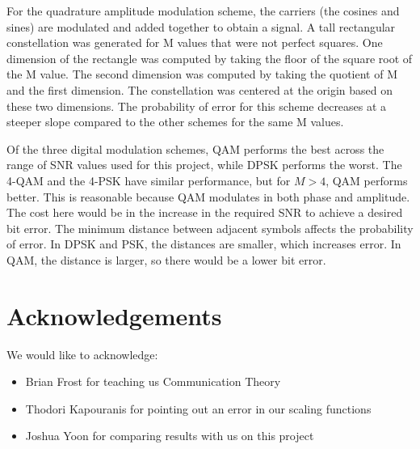 \documentclass[12pt]{report}
\begin{document}
\quad For the quadrature amplitude modulation scheme, the carriers (the cosines and sines) are modulated and added together to obtain a signal. A tall rectangular constellation was generated for M values that were not perfect squares. One dimension of the rectangle was computed by taking the floor of the square root of the M value. The second dimension was computed by taking the quotient of M and the first dimension. The constellation was centered at the origin based on these two dimensions. The probability of error for this scheme decreases at a steeper slope compared to the other schemes for the same M values.

\quad Of the three digital modulation schemes, QAM performs the best across the range of SNR values used for this project, while DPSK performs the worst. The 4-QAM and the 4-PSK have similar performance, but for $M > 4$, QAM performs better. This is reasonable because QAM modulates in both phase and amplitude. The cost here would be in the increase in the required SNR to achieve a desired bit error. The minimum distance between adjacent symbols affects the probability of error. In DPSK and PSK, the distances are smaller, which increases error. In QAM, the distance is larger, so there would be a lower bit error.

\newpage

\section{Acknowledgements}
We would like to acknowledge:
\begin{itemize}
    \item Brian Frost for teaching us Communication Theory 
    \item Thodori Kapouranis for pointing out an error in our scaling functions
    \item Joshua Yoon for comparing results with us on this project
\end{itemize}

\newpage
\end{document}
